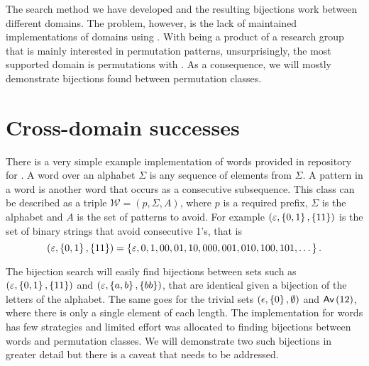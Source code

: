 
\label{ch:results}
The search method we have developed and the resulting bijections work between different domains. The problem, however, is the lack of maintained implementations of domains using \css{}. With \css{} being a product of a research group that is mainly interested in permutation patterns, unsurprisingly, the most supported domain is permutations with \tsc{}. As a consequence, we will mostly demonstrate bijections found between permutation classes.

\section{Cross-domain successes}
There is a very simple example implementation of words provided in repository for \css{}. A word over an alphabet $\Sigma$ is any sequence of elements from $\Sigma$. A pattern in a word is another word that occurs as a consecutive subsequence. This class can be described as a triple $\mathcal{W} = (p, \Sigma, A)$, where $p$ is a required prefix, $\Sigma$ is the alphabet and $A$ is the set of patterns to avoid. For example $(\varepsilon, \left\{0,1\right\}, \left\{11\right\})$ is the set of binary strings that avoid consecutive 1's, that is
\[
    (\varepsilon, \left\{0,1\right\}, \left\{11\right\}) = \left\{\varepsilon, 0, 1, 00, 01, 10, 000, 001, 010, 100, 101, \dotsc\right\}.
\]


The bijection search will easily find bijections between sets such as $(\varepsilon, \left\{0,1\right\}, \left\{11\right\})$ and $(\varepsilon, \left\{a,b\right\}, \left\{bb\right\})$, that are identical given a bijection of the letters of the alphabet. The same goes for the trivial sets $(\epsilon, \left\{0\right\}, \emptyset)$ and $\textsf{Av}\left(12\right)$, where there is only a single element of each length. The implementation for words has few strategies and limited effort was allocated to finding bijections between words and permutation classes. We will demonstrate two such bijections in greater detail but there is a caveat that needs to be addressed.

